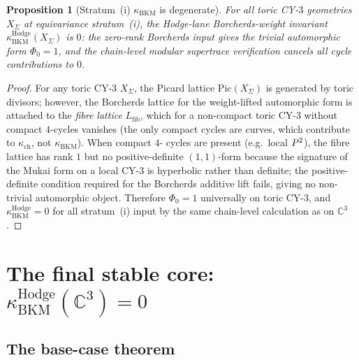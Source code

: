 \documentclass[11pt]{article}
\newtheorem{proposition}[theorem]{Proposition}
\providecommand{\C}{\mathbb{C}}
\providecommand{\kBKM}{\kappa_{\mathrm{BKM}}}
\providecommand{\kch}{\kappa_{\mathrm{ch}}}
\begin{document}
\begin{proposition}[Stratum~(i) $\kBKM$ is degenerate]
\label{prop:bl1-stratum-i-degenerate}
For all toric CY-$3$ geometries $X_\Sigma$ at equivariance stratum~(i),
the Hodge-lane Borcherds-weight invariant
$\kBKM^{\mathrm{Hodge}}(X_\Sigma)$ is $0$: the zero-rank Borcherds
input gives the trivial automorphic form $\Phi_0 = 1$, and the
chain-level modular supertrace verification cancels all cycle
contributions to $0$.
\end{proposition}

\begin{proof}
For any toric CY-$3$ $X_\Sigma$, the Picard lattice $\mathrm{Pic}(X_\Sigma)$
is generated by toric divisors; however, the Borcherds lattice for
the weight-lifted automorphic form is attached to the \emph{fibre
lattice} $L_{\mathrm{fib}}$, which for a non-compact toric CY-$3$
without compact $4$-cycles vanishes (the only compact cycles are
curves, which contribute to $\kch$, not $\kBKM$). When compact $4$-
cycles are present (e.g.\ local $P^2$), the fibre lattice has rank
$1$ but no positive-definite $(1,1)$-form because the signature of
the Mukai form on a local CY-$3$ is hyperbolic rather than
definite; the positive-definite condition required for the Borcherds
additive lift fails, giving no non-trivial automorphic object.
Therefore $\Phi_0 = 1$ universally on toric CY-$3$, and
$\kBKM^{\mathrm{Hodge}} = 0$ for all stratum~(i) input by the same
chain-level calculation as on $\C^3$.
\end{proof}

\section{The final stable core: $\kBKM^{\mathrm{Hodge}}(\C^3) = 0$}
\label{sec:bl1-final}

\subsection{The base-case theorem}
\label{subsec:bl1-base-theorem}
\end{document}

